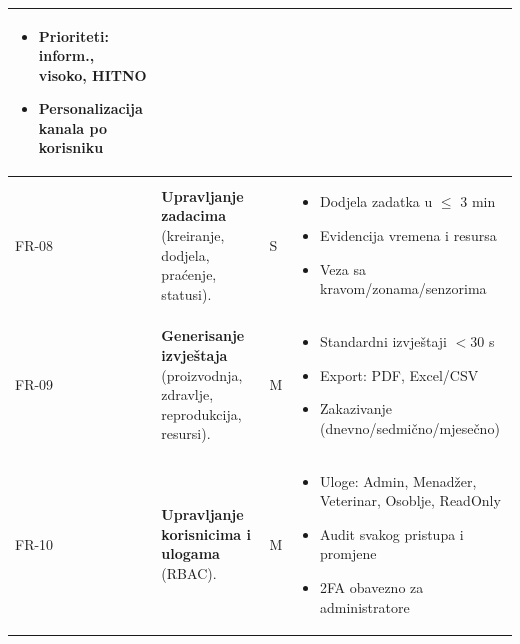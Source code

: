 \documentclass{article}
\begin{document}
\begin{longtable}{|L{1.6cm}|L{8.0cm}|C{0.9cm}|L{6.2cm}|}
\begin{minipage}[t]{6.2cm}
\begin{itemize}
    \item Prioriteti: inform., visoko, HITNO
    \item Personalizacija kanala po korisniku
\end{itemize}\vspace{2pt}
\end{minipage} \\
\hline
FR-08 & \textbf{Upravljanje zadacima} (kreiranje, dodjela, praćenje, statusi). & S &
\begin{minipage}[t]{6.2cm}\vspace{2pt}
\begin{itemize}\setlength\itemsep{2pt}
    \item Dodjela zadatka u $\leq$ 3 min
    \item Evidencija vremena i resursa
    \item Veza sa kravom/zonama/senzorima
\end{itemize}\vspace{2pt}
\end{minipage} \\
\hline
FR-09 & \textbf{Generisanje izvještaja} (proizvodnja, zdravlje, reprodukcija, resursi). & M &
\begin{minipage}[t]{6.2cm}\vspace{2pt}
\begin{itemize}\setlength\itemsep{2pt}
    \item Standardni izvještaji $<30$ s
    \item Export: PDF, Excel/CSV
    \item Zakazivanje (dnevno/sedmično/mjesečno)
\end{itemize}\vspace{2pt}
\end{minipage} \\
\hline
FR-10 & \textbf{Upravljanje korisnicima i ulogama} (RBAC). & M &
\begin{minipage}[t]{6.2cm}\vspace{2pt}
\begin{itemize}\setlength\itemsep{2pt}
    \item Uloge: Admin, Menadžer, Veterinar, Osoblje, ReadOnly
    \item Audit svakog pristupa i promjene
    \item 2FA obavezno za administratore
\end{itemize}\vspace{2pt}
\end{minipage} \\
\hline

\end{longtable}
\end{document}
